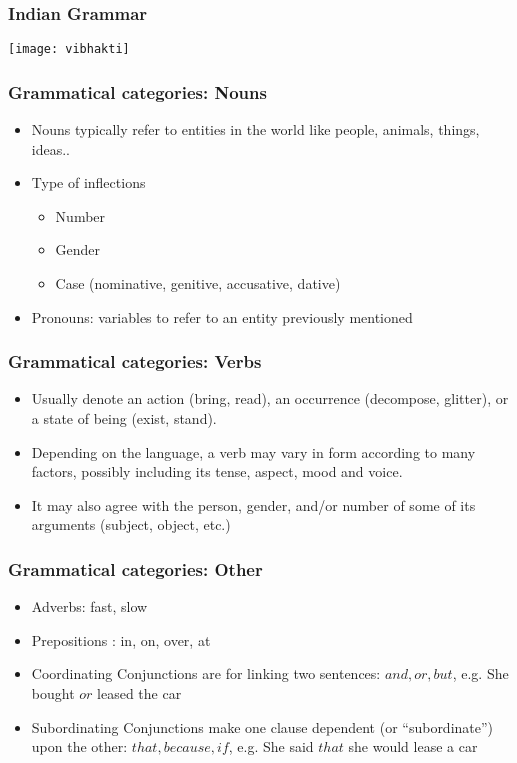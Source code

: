 \begin{frame}[fragile]
  \frametitle{Indian Grammar}
  \begin{center}
\texttt{[image: vibhakti]}
\end{center}
\end{frame}

\begin{frame}[fragile]
  \frametitle{Grammatical categories: Nouns}
  \begin{itemize}
  \item Nouns typically refer to entities in the world like people, animals, things, ideas.. 
  \item Type of inflections
  \begin{itemize}
  \item Number 
  \item Gender 
  \item Case (nominative, genitive, accusative, dative)
  \end{itemize}
  \item Pronouns: variables to refer to an entity previously mentioned
  \end{itemize}
\end{frame}


\begin{frame}[fragile]
  \frametitle{Grammatical categories: Verbs}
  \begin{itemize}
  \item Usually denote an action (bring, read), an occurrence (decompose, glitter), or a state of being (exist, stand). 
  \item Depending on the language, a verb may vary in form according to many factors, possibly including its tense, aspect, mood and voice. 
  \item It may also agree with the person, gender, and/or number of some of its arguments (subject, object, etc.) 
  \end{itemize}
\end{frame}

\begin{frame}[fragile]
  \frametitle{Grammatical categories: Other}
  \begin{itemize}
  \item Adverbs: fast, slow
  \item Prepositions : in, on, over, at
  \item Coordinating Conjunctions are for linking two sentences: $and, or, but$, e.g. She bought $or$ leased the car
  \item Subordinating Conjunctions make one clause dependent (or ``subordinate'') upon the other: $that, because, if$, e.g.  She said $that$ she would lease a car
  \end{itemize}
\end{frame}


